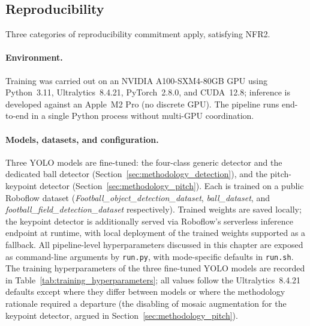 \subsection{Reproducibility}
\label{subsec:methodology_reproducibility}

Three categories of reproducibility commitment apply, satisfying NFR2.

\paragraph{Environment.} Training was carried out on an NVIDIA
A100-SXM4-80GB GPU using Python~3.11, Ultralytics~8.4.21, PyTorch~2.8.0,
and CUDA~12.8; inference is developed against an Apple~M2 Pro (no discrete
GPU). The pipeline runs end-to-end in a single Python process without
multi-GPU coordination.

\paragraph{Models, datasets, and configuration.} Three YOLO models are
fine-tuned: the four-class generic detector and the dedicated ball
detector (Section~\ref{sec:methodology_detection}), and the pitch-keypoint
detector (Section~\ref{sec:methodology_pitch}). Each is trained on a public
Roboflow dataset (\textit{Football\_object\_detection\_dataset},
\textit{ball\_dataset}, and \textit{football\_field\_detection\_dataset}
respectively). Trained weights are saved locally; the keypoint detector
is additionally served via Roboflow's serverless inference endpoint at
runtime, with local deployment of the trained weights supported as a
fallback. All pipeline-level hyperparameters discussed in this chapter
are exposed as command-line arguments by \texttt{run.py}, with mode-specific
defaults in \texttt{run.sh}. The training hyperparameters of the three
fine-tuned YOLO models are recorded in
Table~\ref{tab:training_hyperparameters}; all values follow the
Ultralytics~8.4.21 defaults except where they differ between models or
where the methodology rationale required a departure (the disabling of
mosaic augmentation for the keypoint detector, argued in
Section~\ref{sec:methodology_pitch}).

